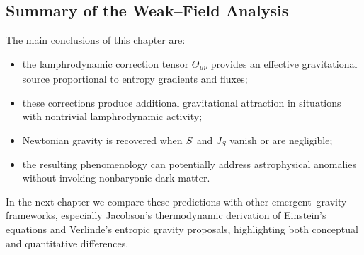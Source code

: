\subsection{Summary of the Weak--Field Analysis}

The main conclusions of this chapter are:
\begin{itemize}
\item the lamphrodynamic correction tensor $\Theta_{\mu\nu}$ provides an
effective gravitational source proportional to entropy gradients and fluxes;
\item these corrections produce additional gravitational attraction in
situations with nontrivial lamphrodynamic activity;
\item Newtonian gravity is recovered when $S$ and $J_S$ vanish or are
negligible;
\item the resulting phenomenology can potentially address astrophysical
anomalies without invoking nonbaryonic dark matter.
\end{itemize}

In the next chapter we compare these predictions with other emergent--gravity
frameworks, especially Jacobson's thermodynamic derivation of Einstein's
equations and Verlinde's entropic gravity proposals, highlighting both
conceptual and quantitative differences.


